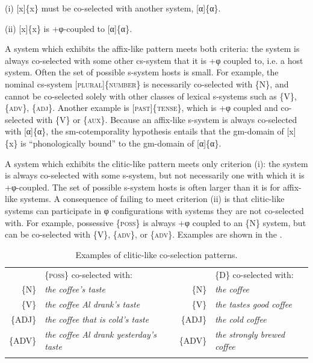     (i)   [x]\{x\} must be co-selected with another system, [α]\{α\}.

    (ii)   [x]\{x\} is +φ-coupled to [α]\{α\}.

  A system which exhibits the affix-like pattern meets both criteria: the system is always co-selected with some other cs-system that it is +φ coupled to, i.e. a host system. Often the set of possible s-system hosts is small. For example, the nominal cs-system [\textsc{plural}]\{\textsc{number}\} is necessarily co-selected with \{N\}, and cannot be co-selected solely with other classes of lexical s-systems such as \{V\}, \{\textsc{adv}\}, \{\textsc{adj}\}. Another example is [\textsc{past}]\{\textsc{tense}\}, which is +φ coupled and co-selected with \{V\} or \{\textsc{aux}\}. Because an affix-like s-system is always co-selected with [α]\{α\}, the sm-cotemporality hypothesis entails that the gm-domain of [x]\{x\} is “phonologically bound” to the gm-domain of [α]\{α\}. 

  A system which exhibits the clitic-like pattern meets only criterion (i): the system is always co-selected with some s-system, but not necessarily one with which it is +φ-coupled. The set of possible s-system hosts is often larger than it is for affix-like systems. A consequence of failing to meet criterion (ii) is that clitic-like systems can participate in φ configurations with systems they are not co-selected with. For example, possessive \{\textsc{poss}\} is always +φ coupled to an \{N\} system, but can be co-selected with \{V\}, \{\textsc{adv}\}, or \{\textsc{adv}\}. Examples are shown in the {\tablebelow}.

\begin{table}
\begin{tabularx}{\textwidth}{rQrQ}
\lsptoprule                                                                                                                                                                      
 &\{\textsc{poss}\} co-selected with:  & & \{\textsc{D}\} co-selected with: \\
 \{N\}& \textit{the coffee’s taste} &  \{N\} &  \textit{the coffee} \\
 \{V\}& \textit{the coffee Al drank’s taste} &  \{V\} & \textit{the tastes good coffee}  \\
 \{\textsc{ADJ}\} & \textit{the coffee that is cold’s taste} & \{\textsc{ADJ}\} & \textit{the cold coffee} \\
 \{\textsc{ADV}\} &             \textit{the coffee Al drank yesterday’s taste} &        \{\textsc{ADV}\} &         \textit{the strongly brewed coffee}\\
\lspbottomrule
\end{tabularx}
\caption{Examples of clitic-like co-selection patterns.}\label{tab:4:1}
\end{table} 

